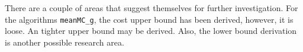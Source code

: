 \documentclass{iitthesis}
\theoremstyle{definition}
\begin{document}
%
%

There are a couple of areas that suggest themselves for further investigation. For the algorithms {\tt meanMC\_g}, the cost upper bound has been derived, however, it is loose. An tighter upper bound may be derived. Also, the lower bound derivation is another possible research area. 
\end{document}
